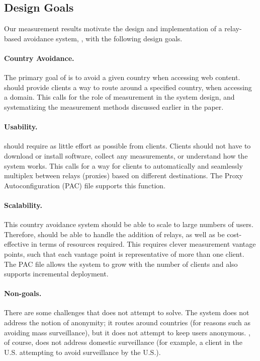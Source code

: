 \subsection{Design Goals}
\label{goals}

Our measurement results motivate 
 the design and implementation of a relay-based avoidance system,
\system{}, with the following design goals.

\paragraph{Country Avoidance.}  The primary goal of \system{} is to
avoid a given country when accessing web content.  \system{} should
provide clients a way to route around a specified country, when
accessing a domain.  This calls for the role of measurement in the
system design, and systematizing the measurement methods discussed
earlier in the paper.

\paragraph{Usability.} \system{} should require as little effort as
possible from clients.  Clients should not have to download
or install software, collect any measurements, or understand how the
system works.  This calls for a way for clients to automatically and
seamlessly multiplex between relays (proxies) based on different
destinations.  The Proxy Autoconfiguration (PAC) file supports this
function.

\paragraph{Scalability.}  This country avoidance system should be able to scale to 
large numbers of users.  Therefore, \system{} should be able to handle the addition
 of relays, as well as be cost-effective in terms of resources required. This requires 
clever measurement vantage points, such that each vantage point is representative of 
more than one client.  The PAC file allows the system to 
grow with the number of clients and also supports incremental deployment.

\paragraph{Non-goals.}  There are some challenges that \system{} does not attempt to 
solve.  The system does not address the notion of anonymity; it routes around 
countries (for reasons such as avoiding mass surveillance), but it does not 
attempt to keep users anonymous.  
\system{}, of course, does not address domestic surveillance (for 
example, a client in the U.S. attempting to avoid surveillance by the 
U.S.).

